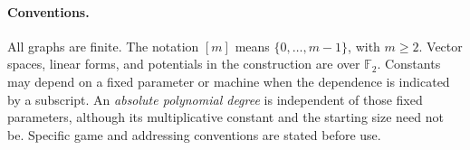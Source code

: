 \documentclass[11pt]{article}
\newcommand{\F}{\mathbb{F}}
\theoremstyle{definition}
\theoremstyle{remark}
\numberwithin{equation}{section}
\begin{document}
\paragraph{Conventions.}
All graphs are finite. The notation $[m]$ means
$\{0,\ldots,m-1\}$, with $m\ge2$. Vector spaces, linear forms,
and potentials in the construction are over $\F_2$.
Constants may depend on a fixed parameter or machine when the
dependence is indicated by a subscript. An \emph{absolute polynomial
degree} is independent of those fixed parameters, although its
multiplicative constant and the starting size need not be.
Specific game and addressing conventions are stated before use.







\end{document}
